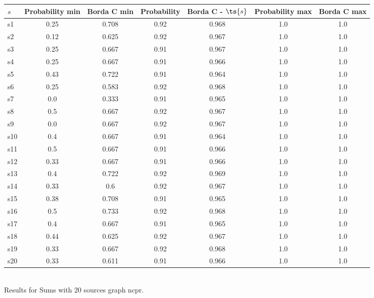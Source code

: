 \documentclass{article}
\begin{document}
\noindent\begin{tabular}{|l|c|c|c|c|c|c|}
\hline
$s$& Probability min & Borda C min & Probability & Borda C - $\ts{s}$ & Probability max & Borda C max\\
\hline
s1 &0.25 & 0.708 & 0.92 & 0.968 & 1.0 & 1.0\\
\hline
s2 &0.12 & 0.625 & 0.92 & 0.967 & 1.0 & 1.0\\
\hline
s3 &0.25 & 0.667 & 0.91 & 0.967 & 1.0 & 1.0\\
\hline
s4 &0.25 & 0.667 & 0.91 & 0.966 & 1.0 & 1.0\\
\hline
s5 &0.43 & 0.722 & 0.91 & 0.964 & 1.0 & 1.0\\
\hline
s6 &0.25 & 0.583 & 0.92 & 0.968 & 1.0 & 1.0\\
\hline
s7 &0.0 & 0.333 & 0.91 & 0.965 & 1.0 & 1.0\\
\hline
s8 &0.5 & 0.667 & 0.92 & 0.967 & 1.0 & 1.0\\
\hline
s9 &0.0 & 0.667 & 0.92 & 0.967 & 1.0 & 1.0\\
\hline
s10 &0.4 & 0.667 & 0.91 & 0.964 & 1.0 & 1.0\\
\hline
s11 &0.5 & 0.667 & 0.91 & 0.966 & 1.0 & 1.0\\
\hline
s12 &0.33 & 0.667 & 0.91 & 0.966 & 1.0 & 1.0\\
\hline
s13 &0.4 & 0.722 & 0.92 & 0.969 & 1.0 & 1.0\\
\hline
s14 &0.33 & 0.6 & 0.92 & 0.967 & 1.0 & 1.0\\
\hline
s15 &0.38 & 0.708 & 0.91 & 0.965 & 1.0 & 1.0\\
\hline
s16 &0.5 & 0.733 & 0.92 & 0.968 & 1.0 & 1.0\\
\hline
s17 &0.4 & 0.667 & 0.91 & 0.965 & 1.0 & 1.0\\
\hline
s18 &0.44 & 0.625 & 0.92 & 0.967 & 1.0 & 1.0\\
\hline
s19 &0.33 & 0.667 & 0.92 & 0.968 & 1.0 & 1.0\\
\hline
s20 &0.33 & 0.611 & 0.91 & 0.966 & 1.0 & 1.0\\
\hline
\end{tabular}\\

\noindent Results for Sums with 20 sources graph ncpr.
\end{document}
